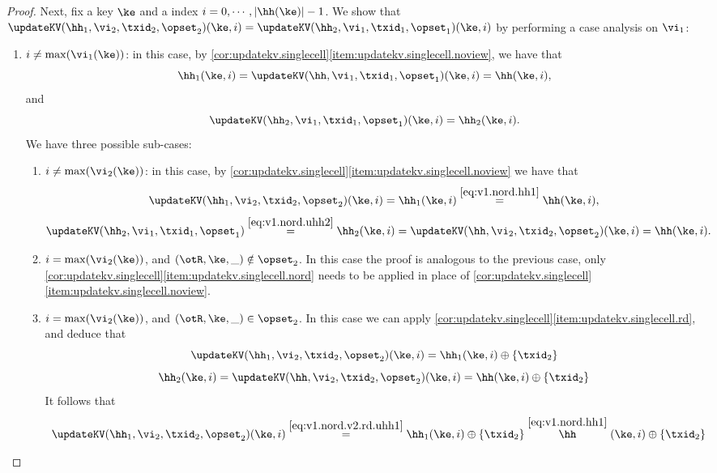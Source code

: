 \begin{proof}
Next, fix a key $\ke$ and a index $i =0, \cdots, \lvert \hh(\ke) \rvert - 1$. 
We show that $\updateKV(\hh_1,\vi_2,\txid_2,\opset_2)(\ke, i) = \updateKV(\hh_2, \vi_1, \txid_1, \opset_1)(\ke, i)$ 
by performing a case analysis on $\vi_1$: 
\begin{enumerate}
\item $i \neq \max(\vi_1(\ke))$: in this case, by \cref{cor:updatekv.singlecell}\eqref{item:updatekv.singlecell.noview}, 
we have that 
\begin{equation}
\hh_1(\ke, i) = \updateKV(\hh, \vi_1, \txid_1, \opset_1)(\ke, i) = \hh(\ke, i), 
\label{eq:v1.nord.hh1}
\end{equation}
and 
\begin{equation}
\updateKV(\hh_2, \vi_1, \txid_1, \opset_1)(\ke, i) = \hh_2(\ke, i).
\label{eq:v1.nord.uhh2}
\end{equation}
We have three possible sub-cases: 
\begin{enumerate}
\item $i \neq \max(\vi_2(\ke))$: in this case, by \cref{cor:updatekv.singlecell}\eqref{item:updatekv.singlecell.noview} we have that 
\[\updateKV(\hh_1, \vi_2, \txid_2, \opset_2)(\ke, i) = 
\hh_1(\ke, i) \stackrel{\eqref{eq:v1.nord.hh1}}{=} \hh(\ke, i), 
\]
\[
\updateKV(\hh_2, \vi_1, \txid_1, \opset_1) \stackrel{\eqref{eq:v1.nord.uhh2}}{=} \hh_2(\ke,i) = 
\updateKV(\hh, \vi_2, \txid_2, \opset_2)(\ke, i) = \hh(\ke, i).
\]
\item $i = \max(\vi_2(\ke))$, and $(\otR, \ke, \_) \notin \opset_2$. In this case the proof is analogous to the previous case, 
only \cref{cor:updatekv.singlecell}\eqref{item:updatekv.singlecell.nord} needs to be applied in place 
of \cref{cor:updatekv.singlecell}\eqref{item:updatekv.singlecell.noview}.
\item $i = \max(\vi_2(\ke))$, and $(\otR, \ke, \_) \in \opset_2$. In this case we can apply \cref{cor:updatekv.singlecell}\eqref{item:updatekv.singlecell.rd}, 
and deduce that 
\begin{equation}
\updateKV(\hh_1, \vi_2, \txid_2, \opset_2)(\ke, i) = \hh_1(\ke, i) \oplus \{\txid_2\}
\label{eq:v1.nord.v2.rd.uhh1}
\end{equation}
\begin{equation}
\hh_2(\ke, i) = \updateKV(\hh, \vi_2, \txid_2, \opset_2)(\ke, i) = \hh(\ke,i) \oplus \{\txid_2\}
\label{eq:v1.nord.v2.rd.hh2}
\end{equation}
It follows that 
\[
\begin{array}{l}
\updateKV(\hh_1, \vi_2, \txid_2, \opset_2)(\ke, i) \stackrel{\eqref{eq:v1.nord.v2.rd.uhh1}}{=} \hh_1(\ke, i) \oplus \{\txid_2 \} \stackrel{\eqref{eq:v1.nord.hh1}} \hh(\ke, i) \oplus \{\txid_2\}\\

\end{array}\]
\end{enumerate}
\end{enumerate}
\end{proof}
